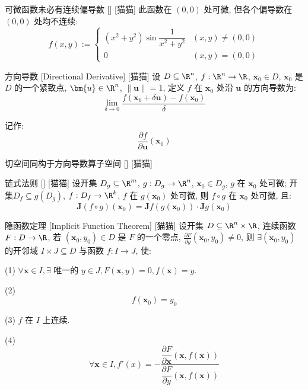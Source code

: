 \documentclass[UTF8]{ctexart}
\begin{document}
			\begin{cxmp}
				[]
				{可微函数未必有连续偏导数}
				[]
				[猫猫]
				此函数在 \((0,0)\) 处可微, 但各个偏导数在 \((0,0)\) 处均不连续: 
				\[f(x,y):=
				\begin{cases}
					(x^2+y^2)\sin\dfrac{1}{x^2+y^2} & (x,y)\neq(0,0)\\
					0 & (x,y)=(0,0)
				\end{cases}\]
			\end{cxmp}

			\begin{dfn}
			    []
			    {方向导数}
			    [Directional Derivative]
			    [猫猫]
				设 \(D\subseteq\R^n\), \(f:\R^n\to\R\), \(\bm{x}_0\in D\), \(\bm{x}_0\) 是 \(D\) 的一个紧致点, \(\bm{u}\in\R^n\), \(\|\bm{u}\|=1\), 定义 \(f\) 在 \(\bm{x}_0\) 处沿 \(\bm{u}\) 的方向导数为: 
				\[\lim_{\delta\to 0}\frac{f(\bm{x}_0+\delta\bm{u})-f(\bm{x}_0)}{\delta}\]

				记作: 
				\[\frac{\partial f}{\partial \bm{u}}(\bm{x}_0)\]
			\end{dfn}

			\begin{ppt}
			    []
			    {切空间同构于方向导数算子空间}
			    []
			    [猫猫]
			\end{ppt}
			
			\begin{thm}
				[]
				{链式法则}
				[]
				[猫猫]
				设开集 \(D_g\subseteq\R^m\), \(g:D_g\to\R^n\), \(\bm{x}_0\in D_g\), \(g\) 在 \(\bm{x}_0\) 处可微; 开集\(D_f\subseteq g(D_g)\), \(f:D_f\to\R^k\), \(f\) 在 \(g(\bm{x}_0)\) 处可微, 则 \(f\circ g\) 在 \(\bm{x}_0\) 处可微, 且: 
				\[\bm{J}(f\circ g)(\bm{x}_0)=\bm{J}f(g(\bm{x}_0))\cdot\bm{J}g(\bm{x}_0)\]
			\end{thm}

			\begin{thm}
				[]
				{隐函数定理}
				[Implicit Function Theorem]
				[猫猫]
				设开集 \(D\subseteq\R^n\times\R\), 连续函数 \(F:D\to\R\), 若 \((\bm{x}_0,y_0)\in D\) 是 \(F\) 的一个零点, \(\frac{\partial F}{\partial y}(\bm{x}_0,y_0)\neq 0\), 则 \(\exists(\bm{x}_0,y_0)\) 的开邻域 \(I\times J\subseteq D\) 与函数 \(f:I\to J\), 使: 

				(1) \(\forall\bm{x}\in I, \exists\) 唯一的 \(y\in J, F(\bm{x},y)=0, f(\bm{x})=y\). 

				(2) \[f(\bm{x}_0)=y_0\]

				(3) \(f\) 在 \(I\) 上连续. 

				(4) \[\forall\bm{x}\in I, f'(x)=-\frac{\dfrac{\partial F}{\partial\bm{x}}(\bm{x},f(\bm{x}))}{\dfrac{\partial F}{\partial y}(\bm{x},f(\bm{x}))}\]
			\end{thm}
\end{document}

